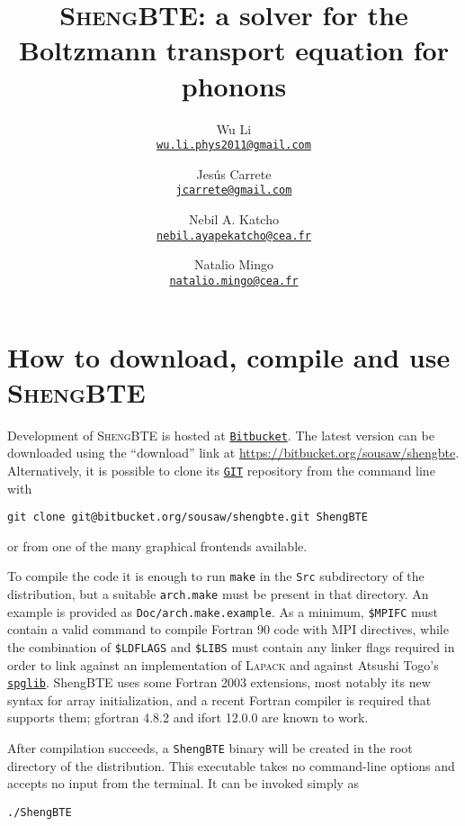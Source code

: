 \documentclass[a4paper,10pt,english]{article}
\title{\textsc{ShengBTE}: a solver for the Boltzmann transport equation for phonons}
\author{
  Wu Li\\\href{mailto:wu.li.phys2011@gmail.com}{\nolinkurl{wu.li.phys2011@gmail.com}}
  \and
  Jes\'us Carrete\\\href{mailto:jcarrete@gmail.com}{\nolinkurl{jcarrete@gmail.com}}
  \and
  Nebil A. Katcho\\\href{mailto:nebil.ayapekatcho@cea.fr}{\nolinkurl{nebil.ayapekatcho@cea.fr}}
  \and
  Natalio Mingo\\\href{mailto:natalio.mingo@cea.fr}{\nolinkurl{natalio.mingo@cea.fr}}
}
\date{}
\begin{document}
\maketitle

\tableofcontents
\newpage


\section{How to download, compile and use \textsc{ShengBTE}}

Development of \textsc{ShengBTE} is hosted at \href{http://www.bitbucket.org}{\nolinkurl{Bitbucket}}. The latest version can be downloaded using the ``download'' link at \url{https://bitbucket.org/sousaw/shengbte}. Alternatively, it is possible to clone its \href{http://git-scm.com/}{\nolinkurl{GIT}} repository from the command line with

\begin{verbatim}
git clone git@bitbucket.org/sousaw/shengbte.git ShengBTE
\end{verbatim}

\noindent or from one of the many graphical frontends available.

To compile the code it is enough to run \texttt{make} in the \texttt{Src} subdirectory of the distribution, but a suitable \texttt{arch.make} must be present in that directory. An example is provided as \texttt{Doc/arch.make.example}. As a minimum, \texttt{\$MPIFC} must contain a valid command to compile Fortran 90 code with MPI directives, while the combination of \texttt{\$LDFLAGS} and \texttt{\$LIBS} must contain any linker flags required in order to link against an implementation of \textsc{Lapack} and against Atsushi Togo's \href{http://spglib.sourceforge.net/}{\nolinkurl{spglib}}. ShengBTE uses some Fortran 2003 extensions, most notably its new syntax for array initialization, and a recent Fortran compiler is required that supports them; gfortran 4.8.2 and ifort 12.0.0 are known to work.

After compilation succeeds, a \texttt{ShengBTE} binary will be created in the root directory of the distribution. This executable takes no command-line options and accepts no input from the terminal. It can be invoked simply as

\begin{verbatim}
./ShengBTE
\end{verbatim}
\end{document}
